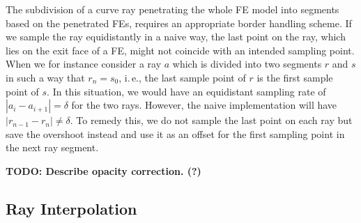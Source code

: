 \documentclass[review,journal]{vgtc}         %
\begin{document}
The subdivision of a curve ray penetrating the whole FE model into segments based on the penetrated FEs, requires an appropriate border handling scheme. If we sample the ray equidistantly in a naive way, the last point on the ray, which lies on the exit face of a FE, might not coincide with an intended sampling point. When we for instance consider a ray $a$ which is divided into two segments $r$ and $s$ in such a way that $r_n = s_0$, i.\,e., the last sample point of $r$ is the first sample point of $s$. In this situation, we would have an equidistant sampling rate of $\left|a_i - a_{i+1}\right| = \delta$ for the two rays. However, the naive implementation will have $\left|r_{n-1} - r_{n}\right| \neq \delta$. To remedy this, we do not sample the last point on each ray but save the overshoot instead and use it as an offset for the first sampling point in the next ray segment.

\textbf{TODO: Describe opacity correction. (?)}


\subsection{Ray Interpolation}
\end{document}
